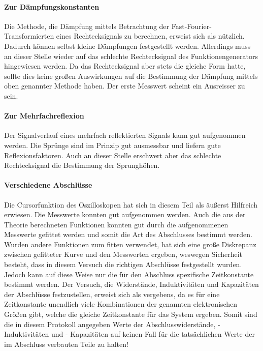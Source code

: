 \paragraph{Zur Dämpfungskonstanten}
Die Methode, die Dämpfung mittels Betrachtung der
Fast-Fourier-Transformierten eines Rechtecksignals zu berechnen, erweist
sich als nützlich. Dadurch können selbst kleine Dämpfungen festgestellt
werden.  Allerdings muss an dieser Stelle wieder auf das schlechte
Rechtecksignal des Funktionengenerators hingewiesen werden.  Da das
Rechtecksignal aber stets die gleiche Form hatte, sollte dies keine
großen Auswirkungen auf die Bestimmung der Dämpfung mittels oben
genannter Methode haben. Der erste Messwert scheint ein Ausreisser 
zu sein.

\paragraph{Zur Mehrfachreflexion}
Der Signalverlauf eines mehrfach reflektierten Signals kann gut
aufgenommen werden. Die Sprünge sind im Prinzip gut ausmessbar und
liefern gute Reflexionsfaktoren.  Auch an dieser Stelle erschwert aber
das schlechte Rechtecksignal die Bestimmung der Sprunghöhen.

\paragraph{Verschiedene Abschlüsse}
Die Cursorfunktion des Oszilloskopen hat sich in diesem Teil als äußerst
Hilfreich erwiesen. Die Messwerte konnten gut aufgenommen werden. Auch
die aus der Theorie berechneten Funktionen konnten gut durch die
aufgenommenen Messwerte gefittet werden und somit die Art des
Abschlusses bestimmt werden.  Wurden andere Funktionen zum fitten
verwendet, hat sich eine große Diskrepanz zwischen gefitteter Kurve und
den Messwerten ergeben, weswegen Sicherheit besteht, dass in diesem
Versuch die richtigen Abschlüsse festgestellt wurden.\\
Jedoch kann auf diese Weise nur die für den Abschluss spezifische 
Zeitkonstante bestimmt werden. Der Versuch, die Widerstände, 
Induktivitäten und Kapazitäten der Abschlüsse festzustellen, 
erweist sich als vergebens, da es für eine Zeitkonstante unendlich 
viele Kombinationen der genannten elektronischen Größen gibt, 
welche die gleiche Zeitkonstante für das System ergeben. Somit 
sind die in diesem Protokoll angegeben Werte der Abschlusswiderstände,
 -Induktivitäten und - Kapazitäten auf keinen Fall für die 
tatsächlichen Werte der im Abschluss verbauten Teile zu halten!
